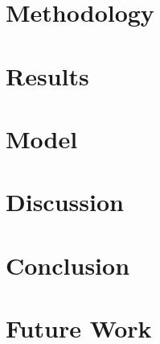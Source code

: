 \documentclass[A4]{scrartcl}
\begin{document}
\section{Methodology}
\label{methodology}


\section{Results}
\label{results}


\section{Model}
\label{model}


\section{Discussion}
\label{discussion}



\section{Conclusion}
\label{conclusion}


\section{Future Work}
\label{future-work}



\newpage
\printbibliography
\end{document}
